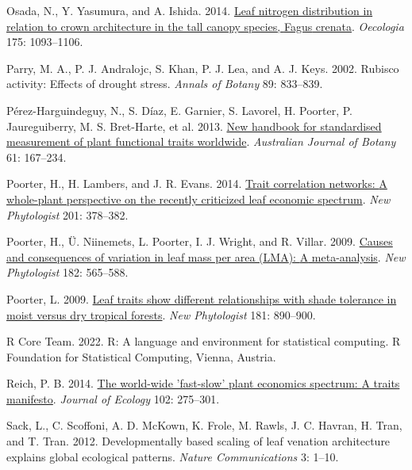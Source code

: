 \documentclass[
  12pt,
  a4paper,
,tablecaptionabove
]{scrartcl}
\newlength{\cslhangindent}
\newenvironment{CSLReferences}[2] %
 {%
  \setlength{\parindent}{0pt}
  \ifodd #1 \everypar{\setlength{\hangindent}{\cslhangindent}}\ignorespaces\fi
  \ifnum #2 > 0
  \setlength{\parskip}{#2\baselineskip}
  \fi
 }%
 {}
\begin{document}
\begin{CSLReferences}{1}{0}
\leavevmode{}%
Osada, N., Y. Yasumura, and A. Ishida. 2014. \href{https://doi.org/10.1007/s00442-014-2966-y}{Leaf nitrogen distribution in relation to crown architecture in the tall canopy species, {Fagus} crenata}. \emph{Oecologia} 175: 1093--1106.

\leavevmode{}%
Parry, M. A., P. J. Andralojc, S. Khan, P. J. Lea, and A. J. Keys. 2002. Rubisco activity: Effects of drought stress. \emph{Annals of Botany} 89: 833--839.

\leavevmode{}%
Pérez-Harguindeguy, N., S. Díaz, E. Garnier, S. Lavorel, H. Poorter, P. Jaureguiberry, M. S. Bret-Harte, et al. 2013. \href{https://doi.org/10.1071/BT12225}{New handbook for standardised measurement of plant functional traits worldwide}. \emph{Australian Journal of Botany} 61: 167--234.

\leavevmode{}%
Poorter, H., H. Lambers, and J. R. Evans. 2014. \href{https://doi.org/10.1111/nph.12547}{Trait correlation networks: {A} whole-plant perspective on the recently criticized leaf economic spectrum}. \emph{New Phytologist} 201: 378--382.

\leavevmode{}%
Poorter, H., Ü. Niinemets, L. Poorter, I. J. Wright, and R. Villar. 2009. \href{https://doi.org/10.1111/j.1469-8137.2009.02830.x}{Causes and consequences of variation in leaf mass per area ({LMA}): {A} meta-analysis}. \emph{New Phytologist} 182: 565--588.

\leavevmode{}%
Poorter, L. 2009. \href{https://doi.org/10.1111/j.1469-8137.2008.02715.x}{Leaf traits show different relationships with shade tolerance in moist versus dry tropical forests}. \emph{New Phytologist} 181: 890--900.

\leavevmode{}%
R Core Team. 2022. R: {A} language and environment for statistical computing. {R Foundation for Statistical Computing}, {Vienna, Austria}.

\leavevmode{}%
Reich, P. B. 2014. \href{https://doi.org/10.1111/1365-2745.12211}{The world-wide 'fast-slow' plant economics spectrum: {A} traits manifesto}. \emph{Journal of Ecology} 102: 275--301.

\leavevmode{}%
Sack, L., C. Scoffoni, A. D. McKown, K. Frole, M. Rawls, J. C. Havran, H. Tran, and T. Tran. 2012. Developmentally based scaling of leaf venation architecture explains global ecological patterns. \emph{Nature Communications} 3: 1--10.


\end{CSLReferences}
\end{document}
